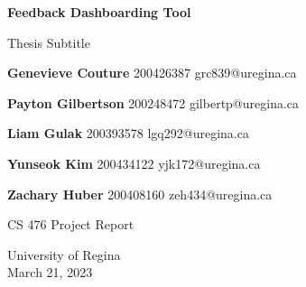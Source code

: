 \begin{titlepage}
    \begin{center}
        \vspace*{2.5cm}
 
        \textbf{Feedback Dashboarding Tool}
 
        \vspace{0.5cm}
         Thesis Subtitle
 
         \vfill
        
 
        \textbf{Genevieve Couture}
        200426387 grc839@uregina.ca
 
        \textbf{Payton Gilbertson}
        200248472 gilbertp@uregina.ca
 
        \textbf{Liam Gulak}
        200393578 lgq292@uregina.ca
 
        \textbf{Yunseok Kim}
        200434122 yjk172@uregina.ca
 
        \textbf{Zachary Huber}
        200408160 zeh434@uregina.ca
 
        \vspace{1.5cm}  
        CS 476 Project Report
             
        \vspace{0.8cm}
      
             
        University of Regina\\
        March 21, 2023
             
    \end{center}
 \end{titlepage}